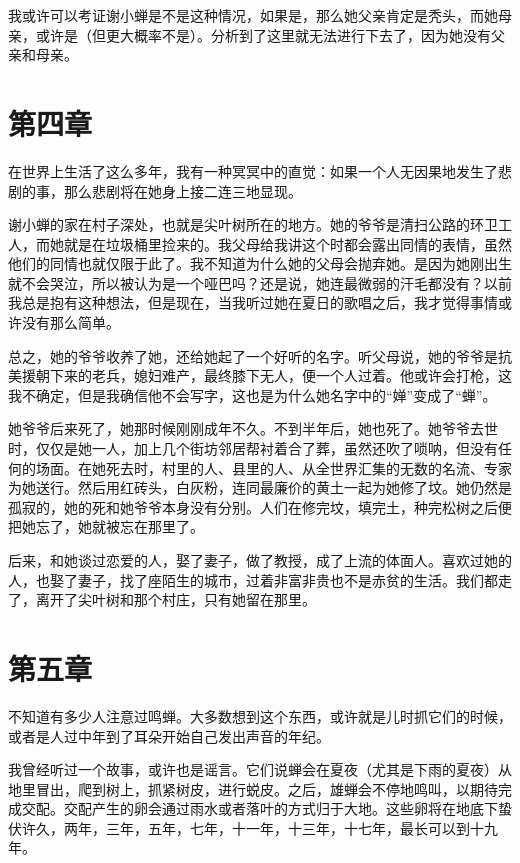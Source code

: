 \documentclass[lang=cn]{elegantpaper}
\begin{document}
我或许可以考证谢小蝉是不是这种情况，如果是，那么她父亲肯定是秃头，而她母亲，或许是（但更大概率不是）。分析到了这里就无法进行下去了，因为她没有父亲和母亲。

\section{第四章}
\label{sec:org52908bb}

在世界上生活了这么多年，我有一种冥冥中的直觉：如果一个人无因果地发生了悲剧的事，那么悲剧将在她身上接二连三地显现。

谢小蝉的家在村子深处，也就是尖叶树所在的地方。她的爷爷是清扫公路的环卫工人，而她就是在垃圾桶里捡来的。我父母给我讲这个时都会露出同情的表情，虽然他们的同情也就仅限于此了。我不知道为什么她的父母会抛弃她。是因为她刚出生就不会哭泣，所以被认为是一个哑巴吗？还是说，她连最微弱的汗毛都没有？以前我总是抱有这种想法，但是现在，当我听过她在夏日的歌唱之后，我才觉得事情或许没有那么简单。

总之，她的爷爷收养了她，还给她起了一个好听的名字。听父母说，她的爷爷是抗美援朝下来的老兵，媳妇难产，最终膝下无人，便一个人过着。他或许会打枪，这我不确定，但是我确信他不会写字，这也是为什么她名字中的“婵”变成了“蝉”。

她爷爷后来死了，她那时候刚刚成年不久。不到半年后，她也死了。她爷爷去世时，仅仅是她一人，加上几个街坊邻居帮衬着合了葬，虽然还吹了唢呐，但没有任何的场面。在她死去时，村里的人、县里的人、从全世界汇集的无数的名流、专家为她送行。然后用红砖头，白灰粉，连同最廉价的黄土一起为她修了坟。她仍然是孤寂的，她的死和她爷爷本身没有分别。人们在修完坟，填完土，种完松树之后便把她忘了，她就被忘在那里了。

后来，和她谈过恋爱的人，娶了妻子，做了教授，成了上流的体面人。喜欢过她的人，也娶了妻子，找了座陌生的城市，过着非富非贵也不是赤贫的生活。我们都走了，离开了尖叶树和那个村庄，只有她留在那里。

\section{第五章}
\label{sec:org999a061}

不知道有多少人注意过鸣蝉。大多数想到这个东西，或许就是儿时抓它们的时候，或者是人过中年到了耳朵开始自己发出声音的年纪。

我曾经听过一个故事，或许也是谣言。它们说蝉会在夏夜（尤其是下雨的夏夜）从地里冒出，爬到树上，抓紧树皮，进行蜕皮。之后，雄蝉会不停地鸣叫，以期待完成交配。交配产生的卵会通过雨水或者落叶的方式归于大地。这些卵将在地底下蛰伏许久，两年，三年，五年，七年，十一年，十三年，十七年，最长可以到十九年。
\end{document}
